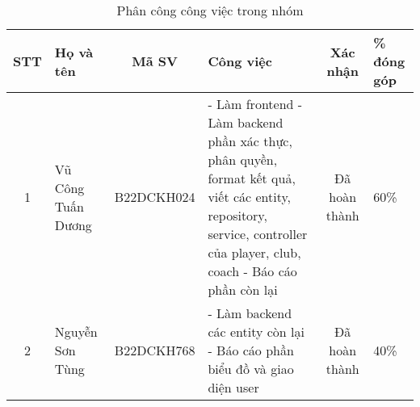 \documentclass[../BTL.tex]{subfiles}
\begin{document}
	
\begin{table}[htbp]
	\centering
	\small
	\renewcommand{\arraystretch}{1.2}
	\caption{Phân công công việc trong nhóm}
	\label{tab:phan-cong-cong-viec}
	\begin{tabularx}{\textwidth}{|c|p{2.5cm}|c|X|c|p{1.3cm}|}
		\hline
		\textbf{STT} & \textbf{Họ và tên} & \textbf{Mã SV} & \textbf{Công việc} & \textbf{Xác nhận} & \textbf{\% đóng góp} \\
		\hline
		1 & Vũ Công Tuấn Dương & B22DCKH024 & 
		- Làm frontend\newline
		- Làm backend phần xác thực, phân quyền, format kết quả, viết các entity, repository, service, controller của player, club, coach\newline
		- Báo cáo phần còn lại & Đã hoàn thành & 60\% \\
		\hline
		2 & Nguyễn Sơn Tùng & B22DCKH768 & 
		- Làm backend các entity còn lại\newline
		- Báo cáo phần biểu đồ và giao diện user & Đã hoàn thành & 40\% \\
		\hline
	\end{tabularx}
\end{table}
\end{document}

